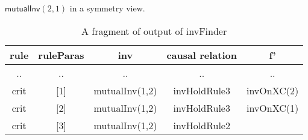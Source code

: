 \documentclass[conference]{IEEEtran}
\def \eqc {\doteq }
\def \andc {\barwedge }
\def \negc {!}
\begin{document}
\begin{description}
$\mathsf{mutualInv}(2,1)$ in a symmetry view. %


\end{description}


 \begin{table}[htbp]
\centering \caption{A fragment of output of {\sf invFinder}\label{table:groundCausalRelation}} %
\begin{tabular}{|c|c|c|c|c|  }
\hline
  rule& ruleParas&inv&causal relation &   f'  \\
\hline
  .. & ..&.. &..&.. \\

\hline
  crit  & [1]&mutualInv(1,2)& invHoldRule3 &invOnXC(2) \\
\hline
  crit &[2]& mutualInv(1,2)& invHoldRule3 &invOnXC(1)  \\
\hline
  crit & [3]& mutualInv(1,2) & invHoldRule2  & \\
\hline

\end{tabular}
\end{table}
\end{document}

